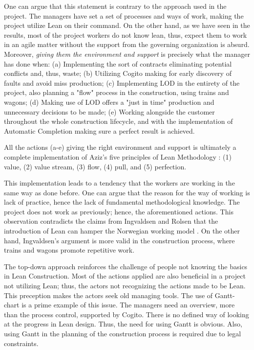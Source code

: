 One can argue that this statement is contrary to the approach used in the project. The managers have set a set of processes and ways of work, making the project utilize Lean on their command.  On the other hand, as we have seen in the results, most of the project workers do not know lean, thus, expect them to work in an agile matter without the support from the governing organization is absurd. Moreover, \textit{giving them the environment and support} is precisely what the manager has done when: (a) Implementing the sort of contracts eliminating potential conflicts and, thus, waste; (b) Utilizing Cogito making for early discovery of faults and avoid miss production; (c) Implementing LOD in the entirety of the project, also planning a "flow" process in the construction, using trains and wagons; (d) Making use of LOD offers a "just in time" production and unnecessary decisions to be made; (e) Working alongside the customer throughout the whole construction lifecycle, and with the implementation of Automatic Completion making sure a perfect result is achieved. 

All the actions (a-e) giving the right environment and support is ultimately a complete implementation of Aziz's five principles of Lean Methodology \cite{aziz2013applying}: (1) value, (2) value stream, (3) flow, (4) pull, and (5) perfection. 

This implementation leads to a tendency that the workers are working in the same way as done before. One can argue that the reason for the way of working is lack of practice, hence the lack of fundamental methodological knowledge. The project does not work as previously; hence, the aforementioned actions. This observation contradicts the claims from Ingvaldsen and Rolsen that the introduction of Lean can hamper the Norwegian working model \cite{ingvaldsen2012lean}. On the other hand, Ingvaldsen's argument is more valid in the construction process, where trains and wagons promote repetitive work.

The top-down approach reinforces the challenge of people not knowing the basics in Lean Construction. Most of the actions applied are also beneficial in a project not utilizing Lean; thus, the actors not recognizing the actions made to be Lean. This preception makes the actors seek old managing tools. The use of Gantt-chart is a prime example of this issue. The managers need an overview, more than the process control, supported by Cogito. There is no defined way of looking at the progress in Lean design. Thus, the need for using Gantt is obvious. Also, using Gantt in the planning of the construction process is required due to legal constraints. 

